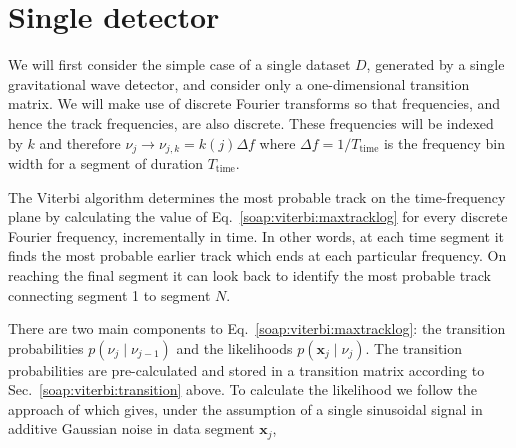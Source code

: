 \section{\label{soap:single}Single detector}
%
%

We will first consider the simple case of a single dataset $D$, generated by a single gravitational wave detector, and consider only a one-dimensional transition matrix. We will make use of discrete Fourier transforms so that frequencies, and hence the track frequencies, are also discrete. These frequencies will be indexed by $k$ and therefore $\nu_j \rightarrow \nu_{j,k}=k(j)\Delta f$ where $\Delta f=1/T_{\text{time}}$ is the frequency bin width for a segment of duration $T_{\text{time}}$.

 The Viterbi algorithm determines the most probable track on the time-frequency plane by calculating the value of Eq.~\ref{soap:viterbi:maxtracklog} for every discrete Fourier frequency, incrementally in time. In other words, at each time segment it finds the most probable earlier track which ends at each particular frequency. On reaching the final segment it can look back to identify the most probable track connecting segment 1 to segment $N$.

There are two main components to Eq.~\ref{soap:viterbi:maxtracklog}: the transition probabilities $p(\nu_j \mid \nu_{j-1})$ and the likelihoods $p({\bm x_j} \mid \nu_j)$. The transition probabilities are pre-calculated and stored in a transition matrix according to Sec.~\ref{soap:viterbi:transition} above. To calculate the likelihood we follow the approach of \citep{bretthorst1988BayesianSpectruma} which gives, under the assumption of a single sinusoidal signal in additive Gaussian noise in data segment ${\bm x_j}$, 

